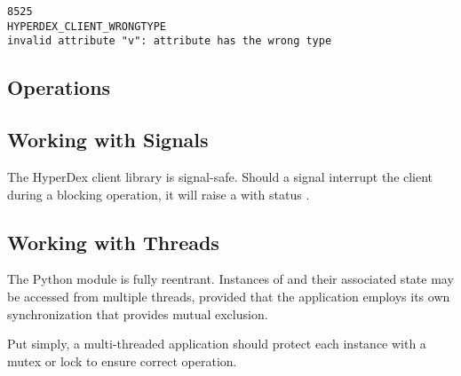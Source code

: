 \begin{verbatim}
8525
HYPERDEX_CLIENT_WRONGTYPE
invalid attribute "v": attribute has the wrong type
\end{verbatim}

\subsection{Operations}
\label{sec:api:python-client:ops}


\pagebreak

\subsection{Working with Signals}
\label{sec:api:python-client:signals}

The HyperDex client library is signal-safe.  Should a signal interrupt the
client during a blocking operation, it will raise a
 with status .

\subsection{Working with Threads}
\label{sec:api:python-client:threads}

The Python module is fully reentrant.  Instances of
 and their associated state may be accessed from
multiple threads, provided that the application employs its own synchronization
that provides mutual exclusion.

Put simply, a multi-threaded application should protect each 
instance with a mutex or lock to ensure correct operation.

